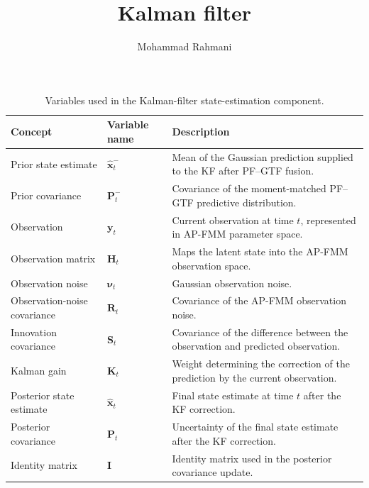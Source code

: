 \documentclass[a4paper]{article}
\title{Kalman filter}
\date{}
\author{Mohammad Rahmani}
\begin{document}
\maketitle
\begin{table}[H]
\centering
\small
\begin{tabular}{p{} p{} p{}}
\hline
\textbf{Concept} & \textbf{Variable name} & \textbf{Description} \\
\hline
Prior state estimate & $\hat{\mathbf{x}}_t^{-}$ & Mean of the Gaussian prediction supplied to the KF after PF--GTF fusion. \\
Prior covariance & $\mathbf{P}_t^{-}$ & Covariance of the moment-matched PF--GTF predictive distribution. \\
Observation & $\mathbf{y}_t$ & Current observation at time $t$, represented in AP-FMM parameter space. \\
Observation matrix & $\mathbf{H}_t$ & Maps the latent state into the AP-FMM observation space. \\
Observation noise & $\boldsymbol{\nu}_t$ & Gaussian observation noise. \\
Observation-noise covariance & $\mathbf{R}_t$ & Covariance of the AP-FMM observation noise. \\
Innovation covariance & $\mathbf{S}_t$ & Covariance of the difference between the observation and predicted observation. \\
Kalman gain & $\mathbf{K}_t$ & Weight determining the correction of the prediction by the current observation. \\
Posterior state estimate & $\hat{\mathbf{x}}_t$ & Final state estimate at time $t$ after the KF correction. \\
Posterior covariance & $\mathbf{P}_t$ & Uncertainty of the final state estimate after the KF correction. \\
Identity matrix & $\mathbf{I}$ & Identity matrix used in the posterior covariance update. \\
\hline
\end{tabular}
\caption{Variables used in the Kalman-filter state-estimation component.}
\label{tab:kalman-filter-variables}
\end{table}
\end{document}
